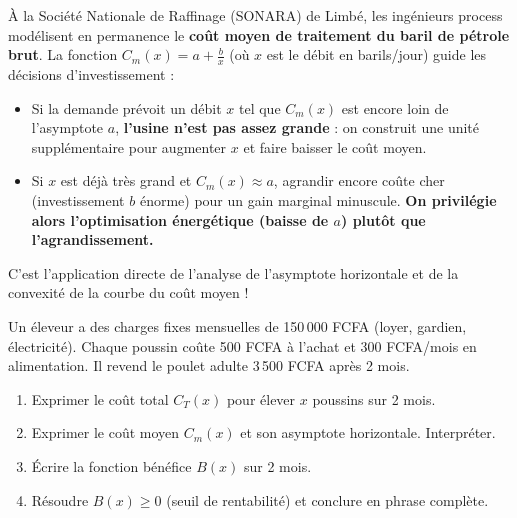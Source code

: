 \documentclass[11pt]{article}
\begin{document}
\begin{savaistu}
À la Société Nationale de Raffinage (SONARA) de Limbé, les ingénieurs process modélisent en permanence le \textbf{coût moyen de traitement du baril de pétrole brut}. La fonction $C_m(x) = a + \frac{b}{x}$ (où $x$ est le débit en barils/jour) guide les décisions d'investissement :
\begin{itemize}
    \item Si la demande prévoit un débit $x$ tel que $C_m(x)$ est encore loin de l'asymptote $a$, \textbf{l'usine n'est pas assez grande} : on construit une unité supplémentaire pour augmenter $x$ et faire baisser le coût moyen.
    \item Si $x$ est déjà très grand et $C_m(x) \approx a$, agrandir encore coûte cher (investissement $b$ énorme) pour un gain marginal minuscule. \textbf{On privilégie alors l'optimisation énergétique (baisse de $a$) plutôt que l'agrandissement.}
\end{itemize}
C'est l'application directe de l'analyse de l'asymptote horizontale et de la convexité de la courbe du coût moyen !
\end{savaistu}

\begin{exercice}
Un éleveur a des charges fixes mensuelles de 150\,000 FCFA (loyer, gardien, électricité). Chaque poussin coûte 500 FCFA à l'achat et 300 FCFA/mois en alimentation. Il revend le poulet adulte 3\,500 FCFA après 2 mois.
\begin{enumerate}
    \item Exprimer le coût total $C_T(x)$ pour élever $x$ poussins sur 2 mois.
    \item Exprimer le coût moyen $C_m(x)$ et son asymptote horizontale. Interpréter.
    \item Écrire la fonction bénéfice $B(x)$ sur 2 mois.
    \item Résoudre $B(x) \ge 0$ (seuil de rentabilité) et conclure en phrase complète.
\end{enumerate}
\end{exercice}
\end{document}
